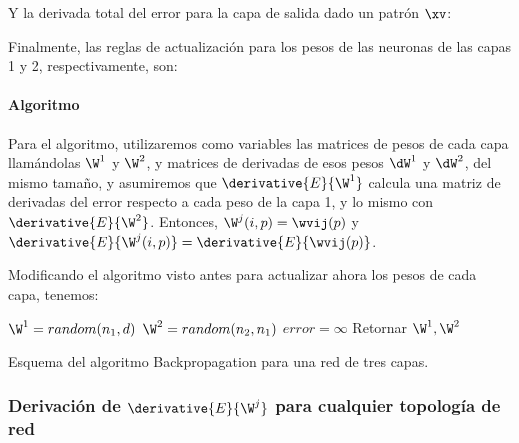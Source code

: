Y la derivada total del error para la capa de salida dado un patrón $\xv$:


Finalmente, las reglas de actualización para los pesos de las neuronas de las capas 1 y 2, respectivamente, son:


\paragraph{Algoritmo}

Para el algoritmo, utilizaremos como variables las matrices de pesos de cada capa llamándolas $\W^1$ y $\W^2$, y matrices de derivadas de esos pesos $\dW^1$ y $\dW^2$, del mismo tamaño, y asumiremos que $\derivative{E}{\W^1}$ calcula una matriz de derivadas del error respecto a cada peso de la capa 1, y lo mismo con $\derivative{E}{\W^2}$. Entonces, $\W^j(i,p)= \wvij(p)$ y $\derivative{E}{\W^j(i,p)}= \derivative{E}{ \wvij(p)}$.

Modificando el algoritmo visto antes para actualizar ahora los pesos de cada capa, tenemos:

\begin{algorithm}[H]
$\W^1=random(n_1,d)$\;
$\W^2=random(n_2,n_1)$\;
$error=\infty$ \;
Retornar  $\W^1,\W^2$ \;
\caption{Esquema del algoritmo Backpropagation para una red de tres capas.} 
\end{algorithm}


\subsubsection{Derivación de $\derivative{E}{\W^j}$ para cualquier topología de red}


